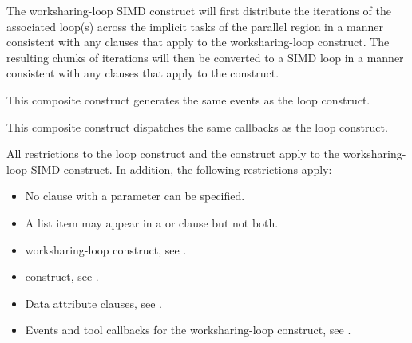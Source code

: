 \descr
The worksharing-loop SIMD construct will first distribute the iterations of the associated loop(s)
across the implicit tasks of the parallel region in a manner consistent with any clauses
that apply to the worksharing-loop construct. The resulting chunks of iterations will then be converted
to a SIMD loop in a manner consistent with any clauses that apply to the 
construct.

\events

This composite construct generates the same events as the loop construct.

\tools

This composite construct dispatches the same callbacks as the loop construct.

\restrictions
All restrictions to the loop construct and the  construct apply to
the worksharing-loop SIMD
construct. In addition, the following restrictions apply:

\begin{itemize}
\item No  clause with a parameter can be specified.
\item A list item may appear in a  or  clause but not both.
\end{itemize}

\begin{samepage}
\crossreferences
\begin{itemize}
\item worksharing-loop construct, see
.

\item {} construct, see
.

\item Data attribute clauses, see
.

\item Events and tool callbacks for the worksharing-loop construct, see
.
\end{itemize}
\end{samepage}

